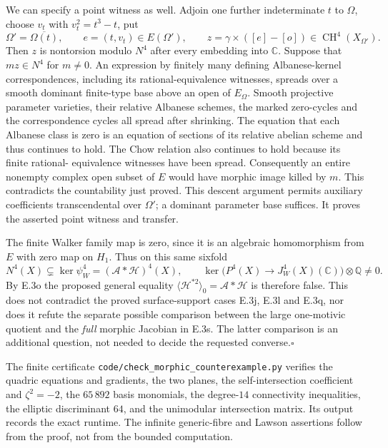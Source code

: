 We can specify a point witness as well. Adjoin one
further indeterminate $t$ to $\Omega$, choose
$v_t$ with $v_t^2=t^3-t$, put
\[
 \Omega'=\overline{\Omega(t)},\qquad
 e=(t,v_t)\in E(\Omega'),\qquad
 z=\gamma\times([e]-[o])\in\operatorname{CH}^4(X_{\Omega'}).
\]
Then $z$ is nontorsion modulo $N^4$ after every
embedding into $\mathbb C$. Suppose that $mz\in N^4$
for $m\ne0$. An expression by finitely many defining
Albanese-kernel correspondences, including its
rational-equivalence witnesses, spreads over a
smooth dominant finite-type base above an open
of $E_\Omega$. Smooth projective parameter
varieties, their relative Albanese schemes, the
marked zero-cycles and the correspondence cycles
all spread after shrinking. The equation that
each Albanese class is zero is an equation of
sections of its relative abelian scheme and thus
continues to hold. The Chow relation also
continues to hold because its finite rational-
equivalence witnesses have been spread.
Consequently an entire nonempty complex open
subset of $E$ would have morphic image killed by
$m$. This contradicts the countability just
proved. This descent argument permits auxiliary
coefficients transcendental over $\Omega'$; a
dominant parameter base suffices. It proves the
asserted point witness and transfer.

The finite Walker family map is zero, since it
is an algebraic homomorphism from $E$ with zero
map on $H_1$. Thus on this same sixfold
\[
 N^4(X)\subsetneq\ker\psi_W^4
                    =(\mathcal A*\mathcal H)^4(X),
 \qquad
 \ker\bigl(P^4(X)\to J_W^4(X)(\mathbb C)\bigr)
                         \otimes\mathbb Q\ne0.
\]
By E.3o the proposed general equality
$\langle\mathcal H^{*2}\rangle_0=\mathcal A*\mathcal H$
is therefore false. This does not contradict the
proved surface-support cases E.3j, E.3l and E.3q,
nor does it refute the separate possible comparison
between the large one-motivic quotient and the
\emph{full} morphic Jacobian in E.3s. The latter
comparison is an additional question, not needed
to decide the requested converse.\hfill$\square$

The finite certificate
\texttt{code/check\_morphic\_counterexample.py} verifies
the quadric equations and gradients, the two planes,
the self-intersection coefficient and $\zeta^2=-2$,
the $65\,892$ basis monomials, the degree-$14$
connectivity inequalities, the elliptic discriminant
$64$, and the unimodular intersection matrix.
Its output records the exact runtime. The infinite
generic-fibre and Lawson assertions follow from
the proof, not from the bounded computation.
